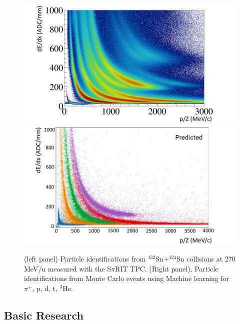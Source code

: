 \documentclass[%
10pt]{article}
\begin{document}
\begin{figure}[htb!]
\centering
\includegraphics[width=0.49\linewidth]{figures/pid_sTPC_data.pdf}
\includegraphics[width=0.49\linewidth]{figures/pid_sTPC_monte_carlo.pdf}
\caption{
(left panel) Particle identifications from $^{132}$Sn+$^{124}$Sn collisions at 270 MeV/u measured with the S$\pi$RIT TPC. (Right panel). Particle identifications from Monte Carlo events using Machine learning for $\pi^+$, p, d, t, $^3$He.
}
\end{figure}
\clearpage
\newpage


\subsection{Basic Research}
\end{document}
